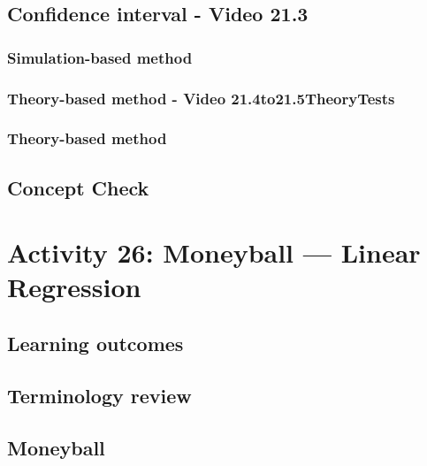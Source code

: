 \documentclass[
]{report}
\begin{document}
\subsection*{Confidence interval - Video 21.3}\label{confidence-interval---video-21.3}

\subsubsection*{Simulation-based method}\label{simulation-based-method-10}

\subsubsection*{Theory-based method - Video 21.4to21.5TheoryTests}\label{theory-based-method---video-21.4to21.5theorytests}

\subsubsection*{Theory-based method}\label{theory-based-method-3}

\subsection{Concept Check}\label{concept-check-12}

\section{Activity 26: Moneyball --- Linear Regression}\label{activity-26-moneyball-linear-regression}

\subsection{Learning outcomes}\label{learning-outcomes-30}

\subsection{Terminology review}\label{terminology-review-23}

\subsection{Moneyball}\label{moneyball}
\end{document}
